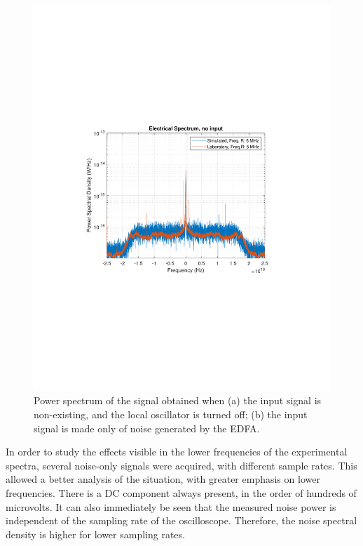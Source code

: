 \begin{figure}[H]
\begin{minipage}{0.43\textwidth}
			\includegraphics[clip, trim=3cm 8cm 3cm 8cm,
			width=1\textwidth]{./sdf/m_qam_system/figures/experimental/noiseSpectra/noInput.pdf}
			\subcaption{\label{fig:edfaNSimul}}
		\end{minipage}
		\caption{Power spectrum of the signal obtained when (a) the
			input signal is non-existing, and the local oscillator is turned off;
		(b) the input signal is made only of noise generated by the EDFA.\label{fig:noises}}
	\end{figure}

	In order to study the effects visible in the lower frequencies of the
	experimental spectra, several noise-only signals were acquired, with different
	sample rates. This allowed a better analysis of the situation, with greater
	emphasis on lower frequencies. There is a DC component always present, in the
	order of hundreds of microvolts. It can also immediately be seen that the
	measured noise power is independent of the sampling rate of the oscilloscope.
	Therefore, the noise spectral density is higher for lower sampling rates.

